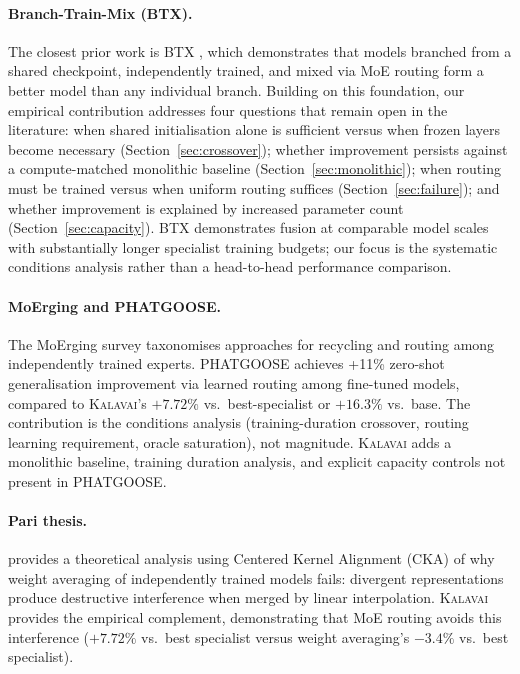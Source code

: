 \documentclass{article}
\newcommand{\kalavai}{\textsc{Kalavai}\xspace}
\begin{document}
\paragraph{Branch-Train-Mix (BTX).} The closest prior work is BTX \citep{sukhbaatar2024branchtrainmix}, which demonstrates that models branched from a shared checkpoint, independently trained, and mixed via MoE routing form a better model than any individual branch. Building on this foundation, our empirical contribution addresses four questions that remain open in the literature: when shared initialisation alone is sufficient versus when frozen layers become necessary (Section~\ref{sec:crossover}); whether improvement persists against a compute-matched monolithic baseline (Section~\ref{sec:monolithic}); when routing must be trained versus when uniform routing suffices (Section~\ref{sec:failure}); and whether improvement is explained by increased parameter count (Section~\ref{sec:capacity}). BTX demonstrates fusion at comparable model scales with substantially longer specialist training budgets; our focus is the systematic conditions analysis rather than a head-to-head performance comparison.

\paragraph{MoErging and PHATGOOSE.} The MoErging survey \citep{yadav2024merging} taxonomises approaches for recycling and routing among independently trained experts. PHATGOOSE \citep{muqeeth2024phatgoose} achieves +11\% zero-shot generalisation improvement via learned routing among fine-tuned models, compared to \kalavai's $+7.72\%$ vs.\ best-specialist or $+16.3\%$ vs.\ base. The contribution is the conditions analysis (training-duration crossover, routing learning requirement, oracle saturation), not magnitude. \kalavai adds a monolithic baseline, training duration analysis, and explicit capacity controls not present in PHATGOOSE.

\paragraph{Pari thesis.} \citet{pari2025merging} provides a theoretical analysis using Centered Kernel Alignment (CKA) of why weight averaging of independently trained models fails: divergent representations produce destructive interference when merged by linear interpolation. \kalavai provides the empirical complement, demonstrating that MoE routing avoids this interference ($+7.72\%$ vs.\ best specialist versus weight averaging's $-3.4\%$ vs.\ best specialist).
\end{document}
